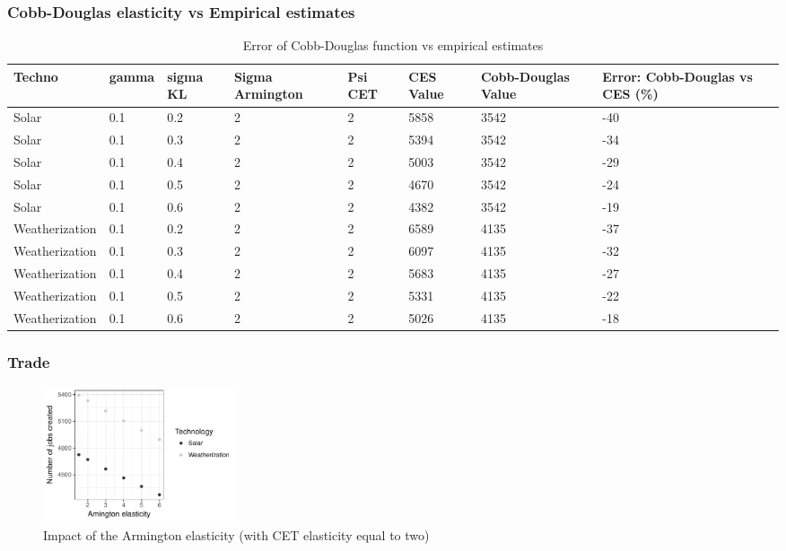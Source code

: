 \subsubsection{Cobb-Douglas elasticity vs Empirical estimates}

\begin{table}[!h]
	\centering
	\caption{Error of Cobb-Douglas function vs empirical estimates}
	\label{tab:CobbDouglasError}
	\begin{tabular}{lp{1.5cm}p{1.5cm}p{1.5cm}p{1.5cm}p{1.5cm}p{1.5cm}p{2cm}}
		\toprule
		Techno & gamma & sigma KL & Sigma Armington & Psi CET & CES Value & Cobb-Douglas Value & Error: Cobb-Douglas vs CES (\%)\\
		\midrule 
		Solar & 0.1 & 0.2 & 2 & 2 & 5858 & 3542 & -40 \\
Solar & 0.1 & 0.3 & 2 & 2 & 5394 & 3542 & -34 \\
Solar & 0.1 & 0.4 & 2 & 2 & 5003 & 3542 & -29 \\
Solar & 0.1 & 0.5 & 2 & 2 & 4670 & 3542 & -24 \\
Solar & 0.1 & 0.6 & 2 & 2 & 4382 & 3542 & -19 \\
Weatherization & 0.1 & 0.2 & 2 & 2 & 6589 & 4135 & -37 \\
Weatherization & 0.1 & 0.3 & 2 & 2 & 6097 & 4135 & -32 \\
Weatherization & 0.1 & 0.4 & 2 & 2 & 5683 & 4135 & -27 \\
Weatherization & 0.1 & 0.5 & 2 & 2 & 5331 & 4135 & -22 \\
Weatherization & 0.1 & 0.6 & 2 & 2 & 5026 & 4135 & -18 \\
		\bottomrule
	\end{tabular}
\end{table}

\clearpage

\subsubsection{Trade}

\begin{figure}[!h]
	\centering
	\includegraphics[height=4cm]{figures/Armington.pdf}
	\caption{Impact of the Armington elasticity (with CET elasticity equal to two)}
	\label{fig:armington}
\end{figure}

